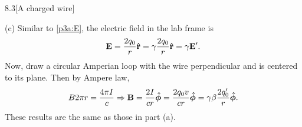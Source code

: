 \documentclass[12pt]{article}
\begin{document}
\begin{problem}{8.3}[A charged wire]
\begin{solution}
(c) Similar to \eqref{p3a:E}, the electric field in the lab frame is
\begin{equation}
    \vb{E}=\frac{2q_0}{r}\vb{\hat{r}}=\gamma\frac{2q_0}{r}\vb{\hat{r}}=\gamma\vb{E}'.
\end{equation}
Now, draw a circular Amperian loop with the wire perpendicular and is centered 
to its plane. Then by Ampere law,
\begin{equation}
    B2\pi r=\frac{4\pi I}{c}\Rightarrow
    \vb{B}=\frac{2I}{cr}\bm{\hat{\phi}}=\frac{2q_0v}{cr}\bm{\hat{\phi}}
    =\gamma\beta\frac{2q_0'}{r}\bm{\hat{\phi}}.
\end{equation}
These results are the same as those in part (a).
\end{solution}
\end{problem}
\newpage
\end{document}
